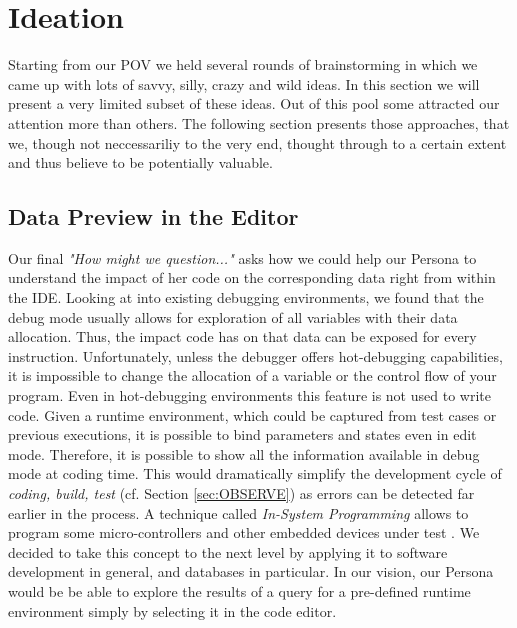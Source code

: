 
\section{Ideation}
\label{sec:IDEATION}

Starting from our POV we held several rounds of brainstorming in which we came up with lots of savvy, silly, crazy and wild ideas. In this section we will present a very limited subset of these ideas. Out of this pool some attracted our attention more than others. The following section presents those approaches, that we, though not neccessariliy to the very end, thought through to a certain extent and thus believe to be potentially valuable.

\subsection{Data Preview in the Editor}
Our final \emph{"How might we question..."} asks how we could help our Persona to understand the impact of her code on the corresponding data right from within the IDE. Looking at into existing debugging environments, we found that the debug mode usually allows for exploration of all variables with their data allocation. Thus, the impact code has on that data can be exposed for every instruction. Unfortunately, unless the debugger offers hot-debugging capabilities, it is impossible to change the allocation of a variable or the control flow of your program. Even in hot-debugging environments this feature is not used to write code.
Given a runtime environment, which could be captured from test cases or previous executions, it is possible to bind parameters and states even in edit mode. Therefore, it is possible to show all the information available in debug mode at coding time. This would dramatically simplify the development cycle of \textit{coding, build, test} (cf. Section \ref{sec:OBSERVE}) as errors can be detected far earlier in the process. A technique called \emph{In-System Programming} allows to program some micro-controllers and other embedded devices under test \cite{herrmann2002apparatus}.
We decided to take this concept to the next level by applying it to software development in general, and databases in particular.  In our vision, our Persona would be be able to explore the results of a query for a pre-defined runtime environment simply by selecting it in the code editor.

